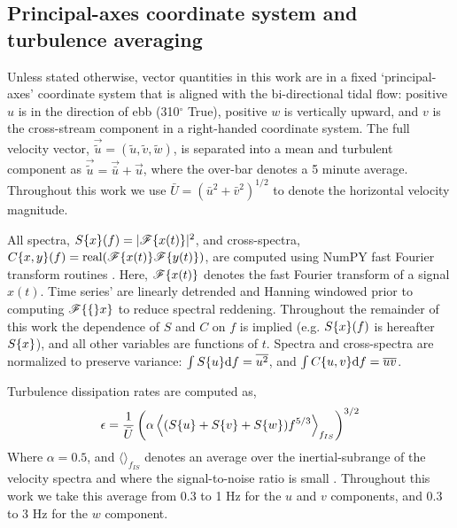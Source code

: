 \subsection{Principal-axes coordinate system and turbulence averaging}

Unless stated otherwise, vector quantities in this work are in a fixed `principal-axes' coordinate system that is aligned with the bi-directional tidal flow: positive $u$ is in the direction of ebb (310$^\circ$ True), positive $w$ is vertically upward, and $v$ is the cross-stream component in a right-handed coordinate system. The full velocity vector, $\vec{\tilde{u}} = (\tilde{u}, \tilde{v}, \tilde{w})$, is separated into a mean and turbulent component as $\vec{\tilde{u}} = \vec{\bar{u}} + \vec{u}$, where the over-bar denotes a 5 minute average. Throughout this work we use $\bar{U} = (\bar{u}^2+\bar{v}^2)^{1/2}$ to denote the horizontal velocity magnitude.

All spectra, $S\{x\}(f)=|\mathscr{F}\{x(t)\}|^2$, and cross-spectra, $C\{x,y\}(f)=\mathrm{real}(\mathscr{F}\{x(t)\}\mathscr{F}\{y(t)\})$, are computed using NumPY fast Fourier transform routines \cite[]{Walt++2011}. Here, $\mathscr{F}\{x(t)\}$ denotes the fast Fourier transform of a signal $x(t)$.  Time series' are linearly detrended and Hanning windowed prior to computing $\mathscr{F}\{\{\}x\}$ to reduce spectral reddening.  Throughout the remainder of this work the dependence of $S$ and $C$ on $f$ is implied (e.g. $S\{x\}(f)$ is hereafter $S\{x\}$), and all other variables are functions of $t$. Spectra and cross-spectra are normalized to preserve variance: $\int S\{u\}\mathrm{d}f = \overline{u^2}$, and  $\int C\{u,v\}\mathrm{d}f = \overline{uv}$.

Turbulence dissipation rates are computed as,
\begin{align}
  \epsilon = \frac{1}{\bar{U}}\left(\alpha\left\langle(S\{u\}+S\{v\}+S\{w\})f^{5/3}\right\rangle_{f_{IS}}\right)^{3/2}
\end{align}
Where  $\alpha=0.5$, and $\langle\rangle_{f_{IS}}$ denotes an average over the inertial-subrange of the velocity spectra and where the signal-to-noise ratio is small \cite[]{Lumley+Terray1983,Sreenivasan1995}. Throughout this work we take this average from 0.3 to 1 Hz for the $u$ and $v$ components, and 0.3 to 3 Hz for the $w$ component.




